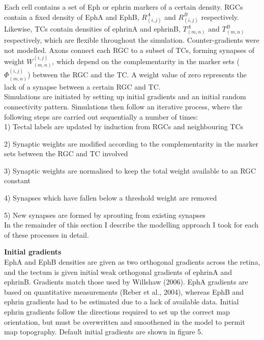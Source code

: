 \documentclass[11pt]{"article"}
\begin{document}
\pagebreak

Each cell contains a set of Eph or ephrin markers of a certain density. RGCs contain a fixed density of EphA and EphB, $R_{(i,j)}^A$ and $R_{(i,j)}^B$ respectively. Likewise, TCs contain densities of ephrinA and ephrinB, $T_{(m,n)}^A$ and $T_{(m,n)}^B$ respectively, which are flexible throughout the simulation. Counter-gradients were not modelled. Axons connect each RGC to a subset of TCs, forming synapses of weight $W^{(i,j)}_{(m,n)}$, which depend on the complementarity in the marker sets ($\Phi^{(i,j)}_{(m,n)}$) between the RGC and the TC. A weight value of zero represents the lack of a synapse between a certain RGC and TC.\\

Simulations are initiated by setting up initial gradients and an initial random connectivity pattern. Simulations then follow an iterative process, where the following steps are carried out sequentially a number of times:\\
 
1) Tectal labels are updated by induction from RGCs and neighbouring TCs
 
2) Synaptic weights are modified according to the complementarity in the marker sets between the RGC and TC involved 

3) Synaptic weights are normalised to keep the total weight available to an RGC constant 

4) Synapses which have fallen below a threshold weight are removed

5) New synapses are formed by sprouting from existing synapses
\\

In the remainder of this section I describe the modelling approach I took for each of these processes in detail.\\


\pagebreak

\textbf{Initial gradients}\\
EphA and EphB densities are given as two orthogonal gradients across the retina, and the tectum is given initial weak orthogonal gradients of ephrinA and ephrinB. Gradients match those used by Willshaw (2006). EphA gradients are based on quantitative measurements (Reber et al., 2004), whereas EphB and ephrin gradients had to be estimated due to a lack of available data. Initial ephrin gradients follow the directions required to set up the correct map orientation, but must be overwritten and smoothened in the model to permit map topography. Default initial gradients are shown in figure 5.\\
\end{document}

